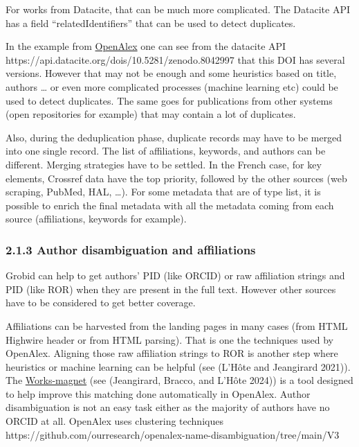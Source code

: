 \documentclass[
]{article}
\begin{document}
For works from Datacite, that can be much more complicated. The Datacite
API has a field ``relatedIdentifiers'' that can be used to detect
duplicates.

In the example from
\href{https://openalex.org/works?page=1\&filter=authorships.author.id\%3Aa5044430271,display_name.search\%3Aconverging}{OpenAlex}
one can see from the datacite API
https://api.datacite.org/dois/10.5281/zenodo.8042997 that this DOI has
several versions. However that may not be enough and some heuristics
based on title, authors \ldots{} or even more complicated processes
(machine learning etc) could be used to detect duplicates. The same goes
for publications from other systems (open repositories for example) that
may contain a lot of duplicates.

Also, during the deduplication phase, duplicate records may have to be
merged into one single record. The list of affiliations, keywords, and
authors can be different. Merging strategies have to be settled. In the
French case, for key elements, Crossref data have the top priority,
followed by the other sources (web scraping, PubMed, HAL, \ldots). For
some metadata that are of type list, it is possible to enrich the final
metadata with all the metadata coming from each source (affiliations,
keywords for example).

\hypertarget{author-disambiguation-and-affiliations}{%
\subsubsection{2.1.3 Author disambiguation and
affiliations}\label{author-disambiguation-and-affiliations}}

Grobid can help to get authors' PID (like ORCID) or raw affiliation
strings and PID (like ROR) when they are present in the full text.
However other sources have to be considered to get better coverage.

Affiliations can be harvested from the landing pages in many cases (from
HTML Highwire header or from HTML parsing). That is one the techniques
used by OpenAlex. Aligning those raw affiliation strings to ROR is
another step where heuristics or machine learning can be helpful (see
(L'Hôte and Jeangirard 2021)). The
\href{https://works-magnet.dataesr.ovh/}{Works-magnet} (see (Jeangirard,
Bracco, and L'Hôte 2024)) is a tool designed to help improve this
matching done automatically in OpenAlex. Author disambiguation is not an
easy task either as the majority of authors have no ORCID at all.
OpenAlex uses clustering techniques
https://github.com/ourresearch/openalex-name-disambiguation/tree/main/V3
\end{document}
